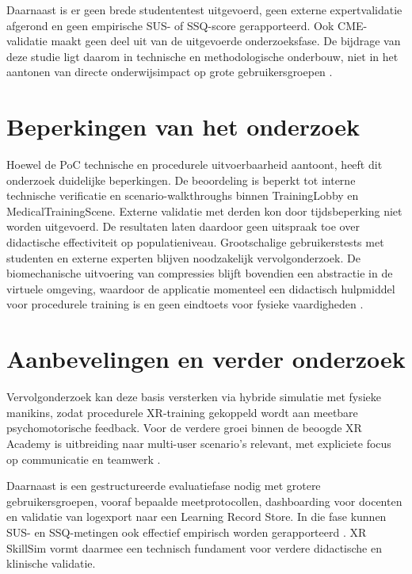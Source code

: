 Daarnaast is er geen brede studententest uitgevoerd, geen externe expertvalidatie afgerond en geen empirische SUS- of SSQ-score gerapporteerd. Ook CME-validatie maakt geen deel uit van de uitgevoerde onderzoeksfase. De bijdrage van deze studie ligt daarom in technische en methodologische onderbouw, niet in het aantonen van directe onderwijsimpact op grote gebruikersgroepen \cite{Kyaw2019VR, Padilha2019VR}.

\section{Beperkingen van het onderzoek}
Hoewel de PoC technische en procedurele uitvoerbaarheid aantoont, heeft dit onderzoek duidelijke beperkingen. De beoordeling is beperkt tot interne technische verificatie en scenario-walkthroughs binnen TrainingLobby en MedicalTrainingScene. Externe validatie met derden kon door tijdsbeperking niet worden uitgevoerd. De resultaten laten daardoor geen uitspraak toe over didactische effectiviteit op populatieniveau. Grootschalige gebruikerstests met studenten en externe experten blijven noodzakelijk vervolgonderzoek. De biomechanische uitvoering van compressies blijft bovendien een abstractie in de virtuele omgeving, waardoor de applicatie momenteel een didactisch hulpmiddel voor procedurele training is en geen eindtoets voor fysieke vaardigheden \cite{ILCOR2023Immersive}.

\section{Aanbevelingen en verder onderzoek}
Vervolgonderzoek kan deze basis versterken via hybride simulatie met fysieke manikins, zodat procedurele XR-training gekoppeld wordt aan meetbare psychomotorische feedback. Voor de verdere groei binnen de beoogde XR Academy is uitbreiding naar multi-user scenario's relevant, met expliciete focus op communicatie en teamwerk \cite{Liaw2018MUVW}.
 
Daarnaast is een gestructureerde evaluatiefase nodig met grotere gebruikersgroepen, vooraf bepaalde meetprotocollen, dashboarding voor docenten en validatie van logexport naar een Learning Record Store. In die fase kunnen SUS- en SSQ-metingen ook effectief empirisch worden gerapporteerd \cite{SUSBrooke1996, Kennedy1993SSQ}. XR SkillSim vormt daarmee een technisch fundament voor verdere didactische en klinische validatie.

